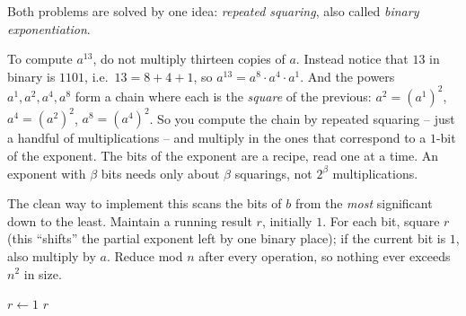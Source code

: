 Both problems are solved by one idea: \emph{repeated squaring}, also called
\emph{binary exponentiation}.

\begin{intuitionbox}
To compute $a^{13}$, do not multiply thirteen copies of $a$. Instead notice that
$13$ in binary is $1101$, i.e.\ $13 = 8 + 4 + 1$, so
$a^{13} = a^{8}\cdot a^{4}\cdot a^{1}$. And the powers $a^1, a^2, a^4, a^8$ form a
chain where each is the \emph{square} of the previous: $a^2 = (a^1)^2$, $a^4 =
(a^2)^2$, $a^8 = (a^4)^2$. So you compute the chain by repeated squaring -- just
a handful of multiplications -- and multiply in the ones that correspond to a
$1$-bit of the exponent. The bits of the exponent are a recipe, read one at a
time. An exponent with $\beta$ bits needs only about $\beta$ squarings, not
$2^{\beta}$ multiplications.
\end{intuitionbox}

The clean way to implement this scans the bits of $b$ from the \emph{most}
significant down to the least. Maintain a running result $r$, initially $1$. For
each bit, square $r$ (this ``shifts'' the partial exponent left by one binary
place); if the current bit is $1$, also multiply by $a$. Reduce mod $n$ after
every operation, so nothing ever exceeds $n^2$ in size.

\begin{algorithm}[H]
\caption{\textsc{Modular-Power}$(a,b,n)$ -- computes $a^b \bmod n$}
\label{ch30:alg-modexp}
$r \leftarrow 1$\;
\Return $r$\;
\end{algorithm}

